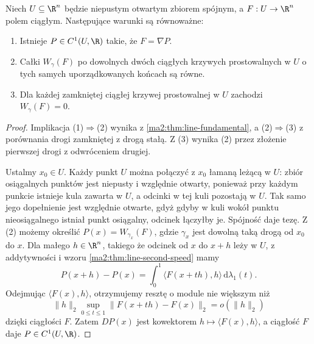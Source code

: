 \begin{twierdzenie}
\label{ma2:thm:line-path-independence}
Niech $U\subseteq\R^n$ będzie niepustym
otwartym zbiorem spójnym, a $F:U\to\R^n$
polem ciągłym. Następujące warunki są równoważne:
\begin{enumerate}
\item Istnieje $P\in C^1(U,\R)$ takie, że
$F=\nabla P$.
\item Całki $W_\gamma(F)$ po dowolnych dwóch
ciągłych krzywych prostowalnych w $U$
o tych samych uporządkowanych końcach są równe.
\item Dla każdej zamkniętej ciągłej krzywej
prostowalnej w $U$ zachodzi $W_\gamma(F)=0$.
\end{enumerate}
\end{twierdzenie}
\begin{proof}
Implikacja (1)$\Rightarrow$(2) wynika z
\ref{ma2:thm:line-fundamental}, a (2)$\Rightarrow$(3)
z porównania drogi zamkniętej z drogą stałą.
Z (3) wynika (2) przez złożenie pierwszej
drogi z odwróceniem drugiej.

Ustalmy $x_0\in U$. Każdy punkt $U$ można
połączyć z $x_0$ łamaną leżącą w $U$:
zbiór osiągalnych punktów jest niepusty
i względnie otwarty, ponieważ przy każdym
punkcie istnieje kula zawarta w $U$,
a odcinki w tej kuli pozostają w $U$.
Tak samo jego dopełnienie jest względnie
otwarte, gdyż gdyby w kuli wokół punktu
nieosiągalnego istniał punkt osiągalny,
odcinek łączyłby je. Spójność daje tezę.
Z (2) możemy określić
$P(x)=W_{\gamma_x}(F)$, gdzie $\gamma_x$
jest dowolną taką drogą od $x_0$ do $x$.
Dla małego $h\in\R^n$, takiego że
odcinek od $x$ do $x+h$ leży w $U$,
z addytywności i wzoru
\ref{ma2:thm:line-second-speed} mamy
\[
 P(x+h)-P(x)=\int_0^1
 \langle F(x+th),h\rangle\,\mathrm d\lambda_1(t).
\]
Odejmując $\langle F(x),h\rangle$,
otrzymujemy resztę o module nie większym niż
\[
 \|h\|_2\sup_{0\le t\le1}\|F(x+th)-F(x)\|_2
 =o(\|h\|_2)
\]
dzięki ciągłości $F$. Zatem $DP(x)$ jest
kowektorem $h\mapsto\langle F(x),h\rangle$,
a ciągłość $F$ daje $P\in C^1(U,\R)$.
\end{proof}


